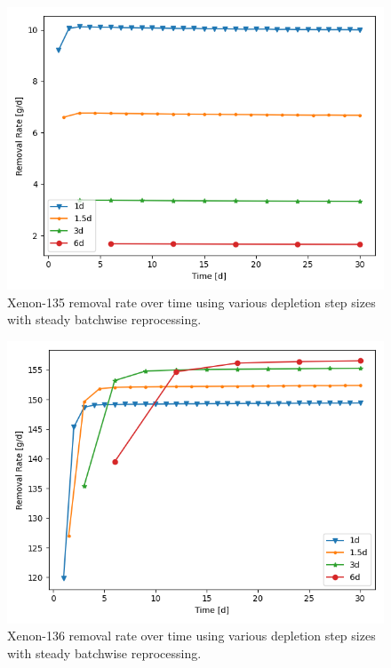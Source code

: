 \begin{figure}[H]
  \centering
  \includegraphics[scale=0.5]{images/waste_Xe135_6d_sp_comp.png}
  \caption{Xenon-135 removal rate over time using various depletion step sizes with steady batchwise reprocessing.}
   \label{fig:steady-batch-xe135-repr}
\end{figure}

\begin{figure}[H]
  \centering
  \includegraphics[scale=0.5]{images/waste_Xe136_6d_sp_comp.png}
  \caption{Xenon-136 removal rate over time using various depletion step sizes with steady batchwise reprocessing.}
   \label{fig:steady-batch-xe136-repr}
\end{figure}

